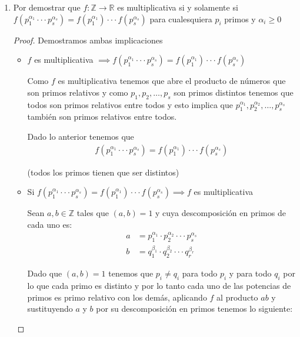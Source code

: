 \documentclass[12pt]{article}
\begin{document}
    \begin{enumerate}
        \item Por demostrar que $f : \mathbb{Z} \longrightarrow \mathbb{R}$ es multiplicativa si y solamente si $f(p_1^{\alpha_1} \cdot \cdot \cdot p_s^{\alpha_s}) = f(p_1^{\alpha_1}) \cdot \cdot \cdot f(p_s^{\alpha_s})$ para cualesquiera $p_i$ primos y $\alpha_i \geq 0$
        
        \begin{proof}
        
        Demostramos ambas implicaciones
        
        \begin{itemize}
            \item $f$ es multiplicativa $\implies f(p_1^{\alpha_1} \cdot \cdot \cdot p_s^{\alpha_s}) = f(p_1^{\alpha_1}) \cdot \cdot \cdot f(p_s^{\alpha_s})$
            
            Como $f$ es multiplicativa tenemos que abre el producto de números que son primos relativos y como $p_1, p_2, \dots , p_s$ son primos distintos tenemos que todos son primos relativos entre todos y esto implica que $p_1^{\alpha_1}, p_2^{\alpha_2}, \dots , p_s^{\alpha_s}$ también son primos relativos entre todos.
            
            Dado lo anterior tenemos que 
                \begin{align*}
                     f(p_1^{\alpha_1} \cdot \cdot \cdot p_s^{\alpha_s}) = f(p_1^{\alpha_1}) \cdot \cdot \cdot f(p_s^{\alpha_s})
                \end{align*}
            
            (todos los primos tienen que ser distintos)
            
            
            \item Si $ f(p_1^{\alpha_1} \cdot \cdot \cdot p_s^{\alpha_s}) = f(p_1^{\alpha_1}) \cdot \cdot \cdot f(p_s^{\alpha_s}) \implies f$ es multiplicativa
            
            Sean $a,b \in \mathbb{Z}$ tales que $(a,b) = 1$ y cuya descomposición en primos de cada uno es:
                \begin{align*}
                    a &= p_1^{\alpha_1} \cdot p_2^{\alpha_2} \cdot \cdot \cdot p_s^{\alpha_s} \\
                    b &= q_1^{\beta_1} \cdot q_2^{\beta_2} \cdot \cdot \cdot q_r^{\beta_r}
                \end{align*}
                
            Dado que $(a,b) = 1$ tenemos que $p_i \neq q_i$ para todo $p_i$ y para todo $q_i$ por lo que cada primo es distinto y por lo tanto cada uno de las potencias de primos es primo relativo con los demás, aplicando $f$ al producto $ab$ y sustituyendo $a$ y $b$ por su descomposición en primos tenemos lo siguiente:
            

\end{itemize}
\end{proof}
\end{enumerate}
\end{document}
